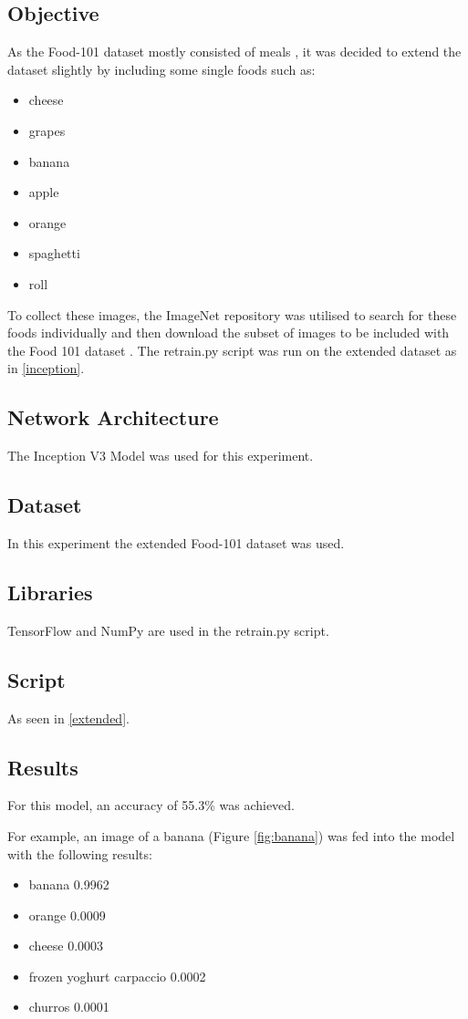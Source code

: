 \subsection*{Objective}
As the Food-101 dataset mostly consisted of meals \parencite{food101}, it was decided to extend the
dataset slightly by including some single foods such as:
\begin{itemize}
    \item{cheese}
    \item{grapes}
    \item{banana}
    \item{apple}
    \item{orange}
    \item{spaghetti}
    \item{roll}
\end{itemize}

To collect these images, the ImageNet repository was utilised to search for
these foods individually and then download the subset of images to be included
with the Food 101 dataset \parencite{imagenet}. The retrain.py script was run on the extended dataset as in
\ref{inception}.

\subsection*{Network Architecture}
The Inception V3 Model was used for this experiment.

\subsection*{Dataset}
In this experiment the extended Food-101 dataset was used.

\subsection*{Libraries}
TensorFlow and NumPy are used in the retrain.py script.

\subsection*{Script}
As seen in \ref{extended}.

\subsection*{Results}
For this model, an accuracy of 55.3\% was achieved.

For example, an image of a banana (Figure \ref{fig:banana}) was fed into the model with
the following results:
\begin{itemize}
    \item{banana 0.9962}
    \item{orange 0.0009}
    \item{cheese 0.0003}
    \item{frozen yoghurt carpaccio 0.0002}
    \item{churros 0.0001}
\end{itemize}
 
